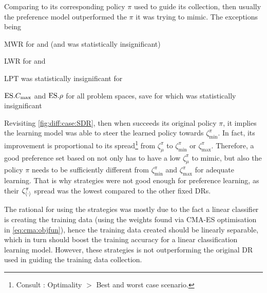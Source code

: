 
\pagebreak
Comparing  to its corresponding policy $\pi$ used to guide its 
collection, then usually the preference model outperformed the $\pi$ it 
was trying to mimic. The exceptions being 
\begin{enumerate*}
  \item MWR for  and  (and  was 
  statistically insignificant)
  \item LWR for  and 
  \item LPT was statistically insignificant for 
  \item $\text{ES}.{C_{\max}}$ and $\text{ES}.{\rho}$ for all problem spaces, save for  
  which was statistically insignificant
\end{enumerate*}
Revisiting \cref{fig:diff:case:SDR}, then when  
succeeds its original policy $\pi$, it implies the learning model was able to 
steer the learned policy towards $\zeta_{\min}^{\pi}$. 
In fact, its improvement is proportional to its spread\footnote{Consult \shiny:
    Optimality $>$ Best and worst case scenario.}  
from $\zeta_{\mu}^{\pi}$ to $\zeta_{\min}^{\pi}$ or $\zeta_{\max}^{\pi}$.
Therefore, a good preference set based on \PhiSet{\pi} not only has to have a 
low $\zeta_{\mu}^\pi$ to mimic, but also the policy $\pi$ needs to be 
sufficiently different from $\zeta_{\min}^{\pi}$ and $\zeta_{\max}^{\pi}$ for 
adequate learning. That is why \PhiSet{\CMAES} strategies 
were not good enough for preference learning, as their 
$\zeta^\pi_{\langle \cdot \rangle}$ spread was the lowest compared to the other fixed DRs.

The rational for using the \PhiSet{\CMAES} strategies
was mostly due to the fact a linear classifier is creating the training data 
(using the weights found via CMA-ES optimisation in \cref{eq:cma:objfun}), 
hence the training data created should be linearly separable, which in turn 
should boost the training accuracy for a linear classification learning model. 
However, these strategies is not outperforming the original DR used in guiding 
the training data collection. 

